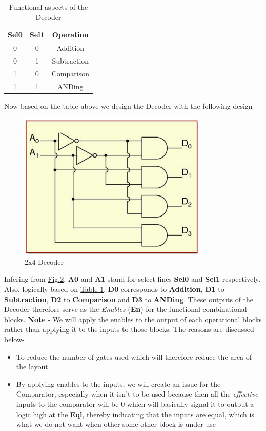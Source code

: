 \documentclass[a4paper, titlepage]{article}
\begin{document}
\begin{table}[h]
\begin{center} 
\hypertarget{dec_tab}{
\begin{tabular}{|c|c|c|}
    \hline 
    \textbf{Sel0} & \textbf{Sel1} & \textbf{Operation} \\
    \hline
    0 & 0 & Addition \\
    \hline 
    0 & 1 & Subtraction \\
    \hline 
    1 & 0 & Comparison \\
    \hline 
    1 & 1 & ANDing \\
    \hline
\end{tabular}}
\caption{Functional aspects of the Decoder}
\label{tab:t1}
\end{center}
\end{table}
Now based on the table above we design the Decoder with the following design - 
\begin{figure}[htp]
    \centering
    \hypertarget{Dec}{\includegraphics[scale = 0.6]{Image_Decoder.png}}
    \caption{2x4 Decoder}
    \label{fig:fig1}
\end{figure}

Infering from \hyperlink{Dec}{Fig.2}, \textbf{A0} and \textbf{A1} stand for select lines \textbf{Sel0}
and \textbf{Sel1} respectively. Also, logically based on \hyperlink{dec_tab}{Table 1}, \textbf{D0} 
corresponds to \textbf{Addition}, \textbf{D1} to \textbf{Subtraction}, \textbf{D2} to \textbf{Comparison} and 
\textbf{D3} to \textbf{ANDing}. These outputs of the Decoder therefore serve as the \textit{Enables} (\textbf{En}) 
for the functional combinational blocks. \newline 
\textbf{Note} - We will apply the enables to the output of each operational blocks rather than applying it 
to the inputs to those blocks. The reasons are discussed below-
\begin{itemize}
    \item To reduce the number of gates used which will therefore reduce the area of the layout 
    \item By applying enables to the inputs, we will create an issue for the Comparator, especially when it isn't to 
    be used because then all the \textit{effective} inputs to the comparator will be 0 which will basically signal it to 
    output a logic high at the \textbf{Eql}, thereby indicating that the inputs are equal, which is what we do not want 
    when other some other block is under use
\end{itemize}
\end{document}
